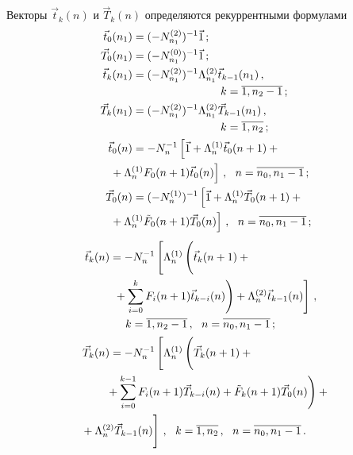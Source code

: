 \begin{multicols}{2}
Векторы $\vec t_k(n)$ и $\vec T_k(n)$ определяются рекуррентными
формулами
\begin{align}
\label{t1}
\vec t_0(n_1) & =
(-N^{(2)}_{n_1})^{-1} \vec 1\,;                
\\
\label{t2}
\vec T_0(n_1) &=
(-N^{(0)}_{n_1})^{-1} \vec 1\,;                 
\\
\label{t3}
\vec t_k(n_1) &=
(-N^{(2)}_{n_1})^{-1} \Lambda^{(2)}_{n_1}
\vec t_{k-1}(n_1)\,,\notag\\
&\hspace*{28mm} k=\overline{1,n_2-1}\,;                    \\
\label{t4}
\vec T_k(n_1) &=
(-N^{(2)}_{n_1})^{-1} \Lambda^{(2)}_{n_1}
\vec T_{k-1}(n_1)\,,\notag\\
&\hspace*{28mm} k=\overline{1,n_2}\,; \\
\label{t5}
\vec t_0(n) &= -N_{n}^{-1} 
\left[
\vec1 + \Lambda^{(1)}_{n} \vec t_0(n+1) +{}\right.\notag\\
&\hspace*{-8mm}\left.{}+ \Lambda^{(1)}_{n} F_0(n+1) \vec t_0(n)
\right]\,,
\ \ n=\overline{n_0,n_1-1}\,;
\\
\label{t6}
\vec T_0(n) &=
(-N^{(1)}_{n})^{-1}
\left[
\vec1 + \Lambda^{(1)}_{n} \vec T_0(n+1) +{}\right.\notag\\
&\hspace*{-8mm}\left.{}+ \Lambda^{(1)}_{n} \tilde F_0(n+1) \vec T_0(n)
\right]\,,
\ \ n=\overline{n_0,n_1-1}\,; 
\end{align}
\begin{align}
\label{t7}
\vec t_k(n) &=
-N_{n}^{-1}
\left[
\Lambda^{(1)}_{n} 
\left(
\vphantom{\sum\limits_i^k}
\vec t_k(n+1) +{}\right.\right.\notag\\
&\left.\left.{}+ \sum\limits_{i=0}^{k} F_i(n+1) \vec t_{k-i}(n)
\right)
+
\Lambda^{(2)}_{n} \vec t_{k-1}(n)
\right]\,,\notag\\
&\hspace*{5mm} k=\overline{1,n_2-1}\,,
\ \ n=\overline{n_0,n_1-1}\,;               
\\
\label{t8}
\vec T_k(n) &=
-N_{n}^{-1}
\left[
\Lambda^{(1)}_{n}
\left(
\vphantom{\sum\limits_i^k}
\vec T_k(n+1) +{}\right.\right.\notag\\
&\hspace*{-2mm}\left.{}+ \sum\limits_{i=0}^{k-1} F_i(n+1) \vec T_{k-i}(n) +
\tilde F_k(n+1) \vec T_0(n)
\right)+{}\notag\\
&\hspace*{-10mm}\left.{}+ \Lambda^{(2)}_{n} \vec T_{k-1}(n)
\vphantom{\sum\limits_i^k}
\right]\,,
\ \ k=\overline{1,n_2}\,,
\ \ n=\overline{n_0,n_1-1}\,.                    
\end{align}


\end{multicols}
